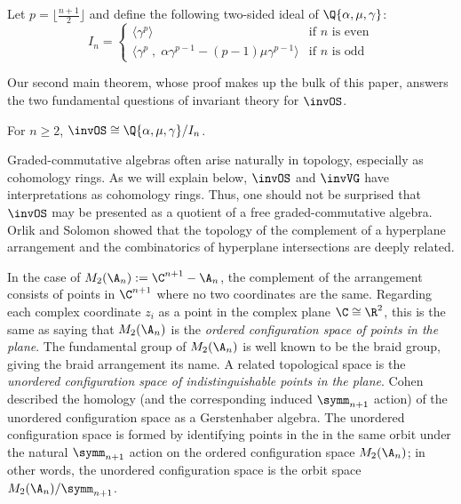 \documentclass{amsart}
\begin{document}
\begin{definition}\label{def:Ideal}
    Let $p = \lfloor \frac{n+1}{2} \rfloor$ and define the following two-sided ideal of $\Q\{\alpha, \mu, \gamma\}$:
    \[I_n = 
    \begin{cases}
        \langle \gamma^p \rangle &\text{if $n$ is even}\\
        \langle \gamma^p\;,\; \alpha \gamma^{p-1} - (p-1) \mu \gamma^{p-1}\rangle &\text{if $n$ is odd}
    \end{cases} \]
\end{definition}

Our second main theorem, whose proof makes up the bulk of this paper, answers the two fundamental questions of invariant theory for $\invOS$.

\begin{theorem} \label{thm:OSnPresentation}
    For $n \geq 2$,
    $\invOS \cong \Q\{\alpha,\mu,\gamma\}/I_n$.
\end{theorem}

Graded-commutative algebras often arise naturally in topology, especially as cohomology rings. 
As we will explain below, $\invOS$ and $\invVG$ have interpretations as cohomology rings.
Thus, one should not be surprised that $\invOS$ may be presented as a quotient of a free graded-commutative algebra.
Orlik and Solomon \cite{orlik-solomon} showed that the topology of the complement of a hyperplane arrangement and the combinatorics of hyperplane intersections are deeply related.

In the case of $M_2(\A_n) := \C^{n+1} - \A_n$, the complement of the arrangement consists of points in $\C^{n+1}$ where no two coordinates are the same. 
Regarding each complex coordinate $z_i$ as a point in the complex plane $\C \cong \R^2$, this is the same as saying that $M_2(\A_n)$ is the \textit{ordered configuration space of points in the plane}.
The fundamental group of $M_2(\A_n)$ is well known to be the braid group, giving the braid arrangement its name.
A related topological space is the \textit{unordered configuration space of indistinguishable points in the plane}.
Cohen \cite[Part~3]{cohen-lada-may} described the homology (and the corresponding induced $\symm_{n+1}$ action) of the unordered configuration space as a Gerstenhaber algebra.
The unordered configuration space is formed by identifying points in the in the same orbit under the natural $\symm_{n+1}$ action on the ordered configuration space $M_2(\A_n)$; in other words, the unordered configuration space is the orbit space $M_2(\A_n)/\symm_{n+1}$.
\end{document}
